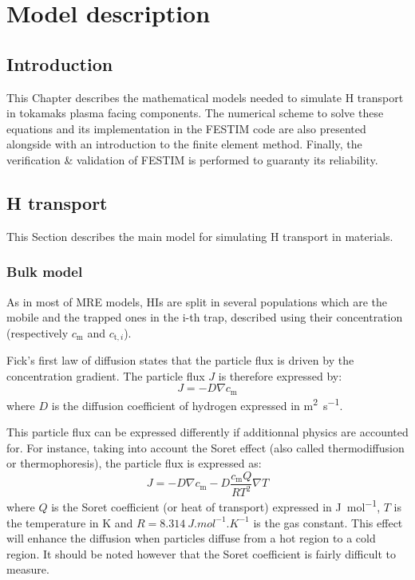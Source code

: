 \setchapterpreamble[u]{\margintoc}
\chapter{Model description}
\label{Chapter2} %
\section{Introduction}
This Chapter describes the mathematical models needed to simulate H transport in tokamaks plasma facing components.
The numerical scheme to solve these equations and its implementation in the FESTIM code are also presented alongside with an introduction to the finite element method.
Finally, the verification \& validation of FESTIM is performed to guaranty its reliability.

\section{H transport} \label{description_H_transport_model}

This Section describes the main model for simulating H transport in materials.

\subsection{Bulk model}
As in most of MRE models, HIs are split in several populations which are the mobile and the trapped ones in the i-th trap, described using their concentration (respectively $c_\mathrm{m}$ and $c_{\mathrm{t},i}$).

Fick's first law of diffusion states that the particle flux is driven by the concentration gradient.
The particle flux $J$ is therefore expressed by:
\begin{equation}
    J = - D \nabla c_\mathrm{m}
\end{equation}
where $D$ is the diffusion coefficient of hydrogen expressed in \si{m^{2}.s^{-1}}. 

This particle flux can be expressed differently if additionnal physics are accounted for.
For instance, taking into account the Soret effect (also called thermodiffusion or thermophoresis), the particle flux is expressed as:
\begin{equation}
    J = - D \nabla c_\mathrm{m} - D \frac{c_\mathrm{m} Q}{R T^2} \nabla T
\end{equation}
where $Q$ is the Soret coefficient (or heat of transport) expressed in \si{J.mol^{-1}}, $T$ is the temperature in \si{K} and $R=\SI{8.314}{J.mol^{-1}.K^{-1}}$ is the gas constant.
This effect will enhance the diffusion when particles diffuse from a hot region to a cold region.
It should be noted however that the Soret coefficient is fairly difficult to measure.

